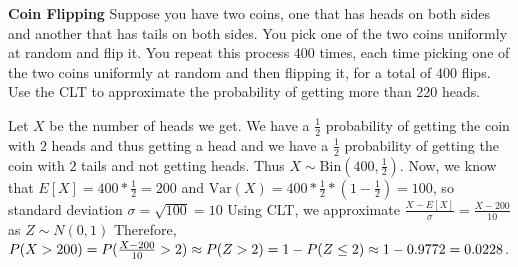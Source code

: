 \question \textbf{Coin Flipping}\newline
Suppose you have two coins, one that has heads on both sides and another that has tails on both sides. You pick one of the two coins uniformly at random and flip it. You repeat this process $400$ times, each time picking one of the two coins uniformly at random and then flipping it, for a total of $400$ flips. \newline 
Use the CLT to approximate the probability of getting more than 220 heads.
\begin{solution}[3cm]
Let $X$ be the number of heads we get. We have a $\frac{1}{2}$ probability of getting the coin with $2$ heads and thus getting a head and we have a $\frac{1}{2}$ probability of getting the coin with $2$ tails and not getting heads. Thus $X \mathtt{\sim} \mathrm{Bin}(400, \frac{1}{2})$. \newline
Now, we know that $E[X] = 400 * \frac{1}{2} = 200$ and $\mathrm{Var}(X) = 400 * \frac{1}{2} * (1-\frac{1}{2}) = 100$, so standard deviation $\sigma = \sqrt{100} = 10$ \newline 
Using CLT, we approximate $\frac{X - E[X]}{\sigma} = \frac{X - 200}{10}$ as $Z \mathtt{\sim}N(0, 1)$ \newline
Therefore, $P(X > 200)  = P(\frac{X - 200}{10} > 2) \approx P(Z > 2) = 1 - P(Z \leq 2) \approx 1 - 0.9772 \\ = 0.0228$.
\end{solution}   